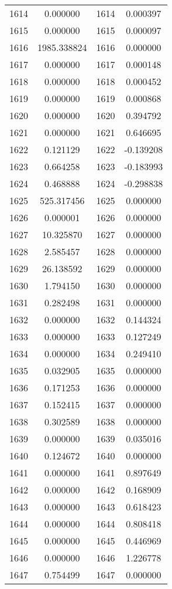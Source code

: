 \documentclass[12pt]{article}
\begin{document}
\begin{longtable}{@{}cccc@{}}
1614 & 0.000000 & 1614 & 0.000397 \\
1615 & 0.000000 & 1615 & 0.000097 \\
1616 & 1985.338824 & 1616 & 0.000000 \\
1617 & 0.000000 & 1617 & 0.000148 \\
1618 & 0.000000 & 1618 & 0.000452 \\
1619 & 0.000000 & 1619 & 0.000868 \\
1620 & 0.000000 & 1620 & 0.394792 \\
1621 & 0.000000 & 1621 & 0.646695 \\
1622 & 0.121129 & 1622 & -0.139208 \\
1623 & 0.664258 & 1623 & -0.183993 \\
1624 & 0.468888 & 1624 & -0.298838 \\
1625 & 525.317456 & 1625 & 0.000000 \\
1626 & 0.000001 & 1626 & 0.000000 \\
1627 & 10.325870 & 1627 & 0.000000 \\
1628 & 2.585457 & 1628 & 0.000000 \\
1629 & 26.138592 & 1629 & 0.000000 \\
1630 & 1.794150 & 1630 & 0.000000 \\
1631 & 0.282498 & 1631 & 0.000000 \\
1632 & 0.000000 & 1632 & 0.144324 \\
1633 & 0.000000 & 1633 & 0.127249 \\
1634 & 0.000000 & 1634 & 0.249410 \\
1635 & 0.032905 & 1635 & 0.000000 \\
1636 & 0.171253 & 1636 & 0.000000 \\
1637 & 0.152415 & 1637 & 0.000000 \\
1638 & 0.302589 & 1638 & 0.000000 \\
1639 & 0.000000 & 1639 & 0.035016 \\
1640 & 0.124672 & 1640 & 0.000000 \\
1641 & 0.000000 & 1641 & 0.897649 \\
1642 & 0.000000 & 1642 & 0.168909 \\
1643 & 0.000000 & 1643 & 0.618423 \\
1644 & 0.000000 & 1644 & 0.808418 \\
1645 & 0.000000 & 1645 & 0.446969 \\
1646 & 0.000000 & 1646 & 1.226778 \\
1647 & 0.754499 & 1647 & 0.000000 \\

\end{longtable}
\end{document}
